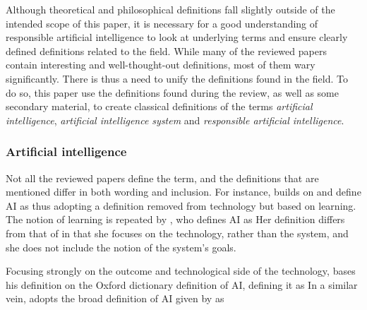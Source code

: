 \label{sec:Definitions}
Although theoretical and philosophical definitions fall slightly outside of the intended scope of this paper, it is necessary for a good understanding of responsible artificial intelligence to look at underlying terms and ensure clearly defined definitions related to the field. While many of the reviewed papers contain interesting and well-thought-out definitions, most of them wary significantly. There is thus a need to unify the definitions found in the field. To do so, this paper use the definitions found during the review, as well as some secondary material, to create classical definitions \parencite[p. 36]{Seppälä_2014} of the terms \textit{artificial intelligence}, \textit{artificial intelligence system} and \textit{responsible artificial intelligence}.


\subsubsection{Artificial intelligence}
\label{sec:definition-ai}
Not all the reviewed papers define the term, and the definitions that are mentioned differ in both wording and inclusion. For instance, \textcite[p. 258]{Mikalef_2022} builds on \textcite{Mikalef_2021_notreview} and define AI as  thus adopting a definition removed from technology but based on learning. The notion of learning is repeated by \textcite[p. 2]{Dignum_2021}, who defines AI as  Her definition differs from that of \citeauthor{Mikalef_2022} in that she focuses on the technology, rather than the system, and she does not include the notion of the system's goals.

Focusing strongly on the outcome and technological side of the technology, \textcite[p. 130-131]{Brand_2022} bases his definition on the Oxford dictionary definition of AI, defining it as  In a similar vein, \textcite[p. 1]{Havrda_2020} adopts the broad definition of AI given by \textcite{IEEE_vision} as 

